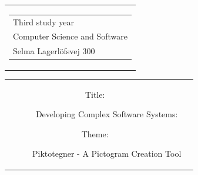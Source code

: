 

\thispagestyle{empty}
\begin{titlingpage}
 \begin{nopagebreak}
 {\samepage 
 \begin{tabular}{r}
\parbox{\textwidth}{  
 \hfill \parbox{4.9cm}{\begin{tabular}{l}
{\textsf\small \textsf{Third study year}}\\
{\textsf\small \textsf{Computer Science and Software}} \\
{\textsf\small \textsf{Selma Lagerlöfsvej 300}} \\
 \end{tabular}}
}
\end{tabular}

 \begin{tabular}{cc}
\parbox{7cm}{
\begin{description}

\item[Title:]

Developing Complex Software Systems:
  
 \item[Theme:]

Piktotegner - A Pictogram Creation Tool

 \end{description}

\parbox{8cm}{

}}
\end{tabular}}
\end{nopagebreak}
\end{titlingpage}
